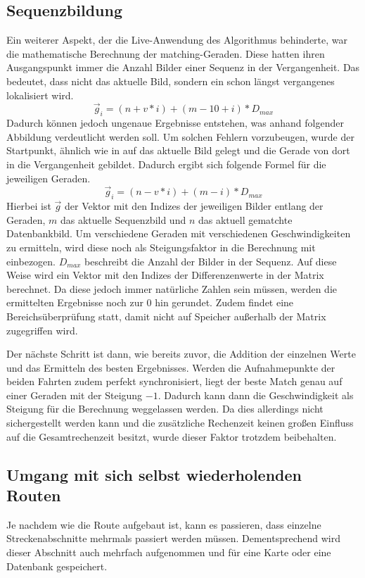 \documentclass[12pt,a4paper,titlepage]{scrartcl}
\begin{document}
\subsection{Sequenzbildung}
Ein weiterer Aspekt, der die Live-Anwendung des Algorithmus behinderte, war die mathematische Berechnung der matching-Geraden. Diese hatten ihren Ausgangspunkt immer die Anzahl Bilder einer Sequenz in der Vergangenheit. Das bedeutet, dass nicht das aktuelle Bild, sondern ein schon längst vergangenes lokalisiert wird. 
\begin{equation}
\vec{g}_{i}=(n+v*i)+(m-10+i)*D_{max}
\end{equation}
Dadurch können jedoch ungenaue Ergebnisse entstehen, was anhand folgender Abbildung verdeutlicht werden soll.
Um solchen Fehlern vorzubeugen, wurde der Startpunkt, ähnlich wie in \cite{wang2015improved} auf das aktuelle Bild gelegt und die Gerade von dort in die Vergangenheit gebildet. Dadurch ergibt sich folgende Formel für die jeweiligen Geraden.
\begin{equation}
\vec{g}_{i}=(n-v*i)+(m-i)*D_{max}
\end{equation}
Hierbei ist $\vec{g}$ der Vektor mit den Indizes der jeweiligen Bilder entlang der Geraden, $m$ das aktuelle Sequenzbild und $n$ das aktuell gematchte Datenbankbild. Um verschiedene Geraden mit verschiedenen Geschwindigkeiten zu ermitteln, wird diese noch als Steigungsfaktor in die Berechnung mit einbezogen. $D_{max}$ beschreibt die Anzahl der Bilder in der Sequenz. Auf diese Weise wird ein Vektor mit den Indizes der Differenzenwerte in der Matrix berechnet. Da diese jedoch immer natürliche Zahlen sein müssen, werden die ermittelten Ergebnisse noch zur $0$ hin gerundet. Zudem findet eine Bereichsüberprüfung statt, damit nicht auf Speicher außerhalb der Matrix zugegriffen wird.

Der nächste Schritt ist dann, wie bereits zuvor, die Addition der einzelnen Werte und das Ermitteln des besten Ergebnisses. Werden die Aufnahmepunkte der beiden Fahrten zudem perfekt synchronisiert, liegt der beste Match genau auf einer Geraden mit der Steigung $-1$. Dadurch kann dann die Geschwindigkeit als Steigung für die Berechnung weggelassen werden. Da dies allerdings nicht sichergestellt werden kann und die zusätzliche Rechenzeit keinen großen Einfluss auf die Gesamtrechenzeit besitzt, wurde dieser Faktor trotzdem beibehalten. 
\subsection{Umgang mit sich selbst wiederholenden Routen}
Je nachdem wie die Route aufgebaut ist, kann es passieren, dass einzelne Streckenabschnitte mehrmals passiert werden müssen. Dementsprechend wird dieser Abschnitt auch mehrfach aufgenommen und für eine Karte oder eine Datenbank gespeichert. 
\end{document}
